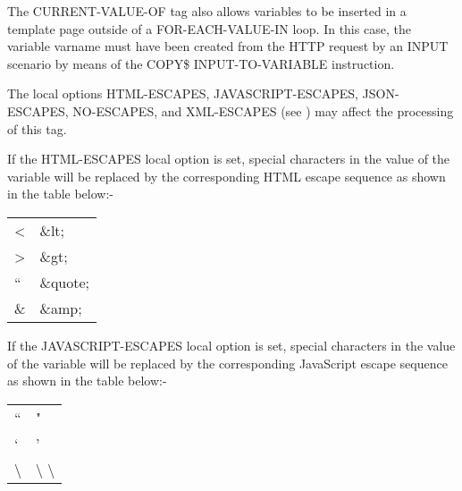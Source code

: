 \documentclass[letterpaper,10pt,english]{sphinxmanual}
\begin{document}
The CURRENT-VALUE-OF tag also allows variables to be inserted in a template page outside of a FOR-EACH-VALUE-IN loop. In this case, the variable varname must have been created from the HTTP request by an INPUT scenario by means of the COPY\$ INPUT-TO-VARIABLE instruction.

The local options HTML-ESCAPES, JAVASCRIPT-ESCAPES, JSON-ESCAPES, NO-ESCAPES, and XML-ESCAPES (see {\hyperref[\detokenize{User_Guide:v457ug-setting-local-options}]{}}) may affect the processing of this tag.

If the HTML-ESCAPES local option is set, special characters in the value of the variable will be replaced by the corresponding HTML escape sequence as shown in the table below:-


\begin{savenotes}\sphinxattablestart
\centering
\begin{tabulary}{\linewidth}[t]{|T|T|}
\hline
{}\relax &\relax \\
\hline
\textless{}
&
\&lt;
\\
\hline
\textgreater{}
&
\&gt;
\\
\hline
“
&
\&quote;
\\
\hline
\&
&
\&amp;
\\
\hline
\end{tabulary}
\par
\sphinxattableend\end{savenotes}

If the JAVASCRIPT-ESCAPES local option is set, special characters in the value of the variable will be replaced by the corresponding JavaScript escape sequence as shown in the table below:-


\begin{savenotes}\sphinxattablestart
\centering
\begin{tabulary}{\linewidth}[t]{|T|T|}
\hline
{}\relax &\relax \\
\hline
“
&
"
\\
\hline
‘
&
'
\\
\hline
\textbackslash{}
&
\textbackslash{} \textbackslash{}
\\
\hline
\end{tabulary}
\par
\sphinxattableend\end{savenotes}
\end{document}
